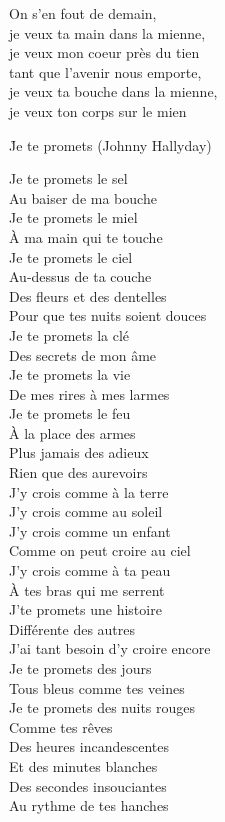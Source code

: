 \documentclass{novel}
\begin{document}
On s'en fout de demain, \\
je veux ta main dans la mienne, \\
je veux mon coeur près du tien \\
tant que l'avenir nous emporte, \\
je veux ta bouche dans la mienne, \\
je veux ton corps sur le mien

\newpage
\small
\h*{Je te promets (Johnny Hallyday)}
\begin{multicols}{2}
Je te promets le sel \\
Au baiser de ma bouche \\
Je te promets le miel \\
À ma main qui te touche \\
Je te promets le ciel \\
Au-dessus de ta couche \\
Des fleurs et des dentelles \\
Pour que tes nuits soient douces \\

Je te promets la clé \\
Des secrets de mon âme \\
Je te promets la vie \\
De mes rires à mes larmes \\
Je te promets le feu \\
À la place des armes \\
Plus jamais des adieux \\
Rien que des aurevoirs \\

J'y crois comme à la terre \\
J'y crois comme au soleil \\
J'y crois comme un enfant \\
Comme on peut croire au ciel \\
J'y crois comme à ta peau \\
À tes bras qui me serrent \\
J'te promets une histoire \\
Différente des autres \\
J'ai tant besoin d'y croire encore \\

Je te promets des jours \\
Tous bleus comme tes veines \\
Je te promets des nuits rouges \\
Comme tes rêves \\
Des heures incandescentes \\
Et des minutes blanches \\
Des secondes insouciantes \\
Au rythme de tes hanches \\


\end{multicols}
\end{document}

